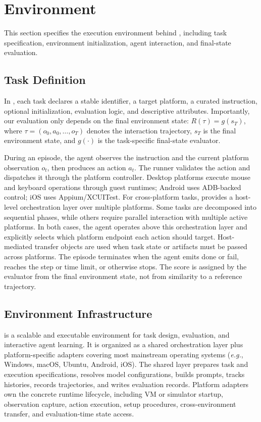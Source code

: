 \section{\dataset Environment}
This section specifies the execution environment behind \dataset, including task specification, environment initialization, agent interaction, and final-state evaluation.

\subsection{Task Definition}
In \dataset, each task declares a stable identifier, a target platform, a curated instruction, optional initialization, evaluation logic, and descriptive attributes. 
Importantly, our evaluation only depends on the final environment state: $R(\tau) = g(s_T)$,
where $\tau=(o_0,a_0,\ldots,o_T)$ denotes the interaction trajectory, $s_T$ is the final environment state, and $g(\cdot)$ is the task-specific final-state evaluator.

During an episode, the agent observes the instruction and the current platform observation $o_t$, then produces an action $a_t$. The runner validates the action and dispatches it through the platform controller. Desktop platforms execute mouse and keyboard operations through guest runtimes; Android uses ADB-backed control; iOS uses Appium/XCUITest. For cross-platform tasks, \dataset provides a host-level orchestration layer over multiple platforms. Some tasks are decomposed into sequential phases, while others require parallel interaction with multiple active platforms. In both cases, the agent operates above this orchestration layer and explicitly selects which platform endpoint each action should target. Host-mediated transfer objects are used when task state or artifacts must be passed across platforms. The episode terminates when the agent emits done or fail, reaches the step or time limit, or otherwise stops. The score is assigned by the evaluator from the final environment state, not from similarity to a reference trajectory.

\subsection{Environment Infrastructure}
\vspace{-5pt}

\dataset is a scalable and executable environment for task design, evaluation, and interactive agent learning. It is organized as a shared orchestration layer plus platform-specific adapters covering most mainstream operating systems (\textit{e.g.}, Windows, macOS, Ubuntu, Android, iOS). The shared layer prepares task and execution specifications, resolves model configurations, builds prompts, tracks histories, records trajectories, and writes evaluation records. Platform adapters own the concrete runtime lifecycle, including VM or simulator startup, observation capture, action execution, setup procedures, cross-environment transfer, and evaluation-time state access.




